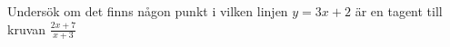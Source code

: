 






Undersök om det finns någon punkt i vilken linjen $ y = 3x+2$ är en tagent till kruvan $ \frac{2x+7}{x+3} $